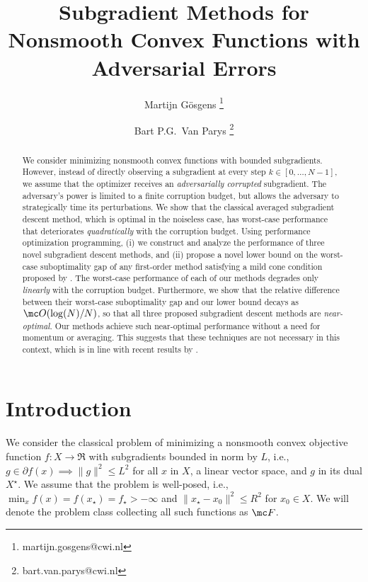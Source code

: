 \documentclass{article}
\title{Subgradient Methods for Nonsmooth Convex Functions with Adversarial Errors}
\author[1]{Martijn G\"osgens  \thanks{martijn.gosgens@cwi.nl}}
\author[1]{Bart P.G.\ Van Parys \thanks{bart.van.parys@cwi.nl}}
\affil[1]{CWI Amsterdam}
\begin{document}
\maketitle
\nocite{boyd2004convex}

\begin{abstract}
We consider minimizing nonsmooth convex functions with bounded subgradients.
However, instead of directly observing a subgradient at every step $k\in [0, \dots, N-1]$, we assume that the optimizer receives an \emph{adversarially corrupted} subgradient.
The adversary's power is limited to a finite corruption budget, but allows the adversary to strategically time its perturbations.
We show that the classical averaged subgradient descent method, which is optimal in the noiseless case, has worst-case performance that deteriorates \emph{quadratically} with the corruption budget. %
Using performance optimization programming, (i) we construct and analyze the performance of three novel subgradient descent methods, and (ii) propose a novel lower bound on the worst-case suboptimality gap of any first-order method satisfying a mild cone condition proposed by \cite{fatkhullin2025sgdhandleheavytailednoise}.
The worst-case performance of each of our methods degrades only \emph{linearly} with the corruption budget.
Furthermore, we show that the relative difference between their worst-case suboptimality gap and our lower bound decays as $\mc O(\log(N)/N)$, so that all three proposed subgradient descent methods are \emph{near-optimal}.
Our methods achieve such near-optimal performance without a need for momentum or averaging. This suggests that these techniques are not necessary in this context, which is in line with recent results by \cite{zamani2023exact}.
\end{abstract}

\section{Introduction}

We consider the classical problem of minimizing a nonsmooth convex objective function $f:X\to\Re$ with subgradients bounded in norm by $L$, i.e.,
\(
g\in \partial f(x) \implies \|g\|^2 \leq L^2
\)
for all $x$ in $X$, a linear vector space, and $g$ in its dual $X^\star$.
We assume that the problem is well-posed, i.e., $\min_{x}f(x) = f(x_\star) = f_\star>-\infty$ and $\| x_\star - x_0 \|^2 \leq R^2$ for $x_0\in X$. We will denote the problem class collecting all such functions as $\mc F$.
\end{document}
